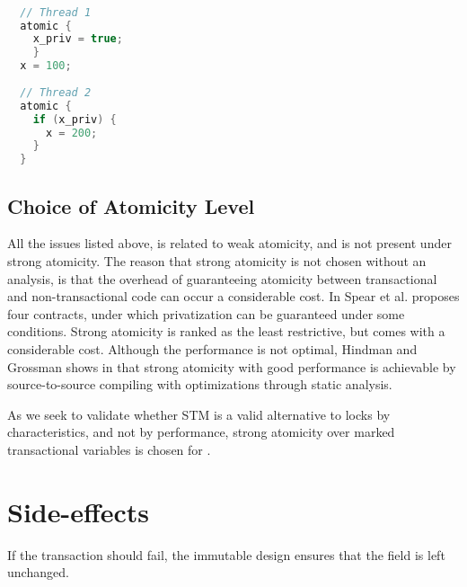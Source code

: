 \begin{lstlisting}[label=lst:privatization,
  caption={Privatization issue},
  language=Java,  
  showspaces=false,
  showtabs=false,
  breaklines=true,
  showstringspaces=false,
  breakatwhitespace=true,
  commentstyle=\color{greencomments},
  keywordstyle=\color{bluekeywords},
  stringstyle=\color{redstrings},
  morekeywords={atomic, retry, orElse, var, get, set}]  % Start your code-block

  // Thread 1
  atomic {
    x_priv = true;
    }
  x = 100;
  
  // Thread 2
  atomic {
    if (x_priv) {
      x = 200;
    }
  }
\end{lstlisting}


\subsection{Choice of Atomicity Level}
All the issues listed above, is related to weak atomicity, and is not present under strong atomicity. The reason that strong atomicity is not chosen without an analysis, is that the overhead of guaranteeing atomicity between transactional and non-transactional code can occur a considerable cost\cite{spear2007privatization}. In \cite{spear2007privatization} Spear et al. proposes four contracts, under which privatization can be guaranteed under some conditions. Strong atomicity is ranked as the least restrictive, but comes with a considerable cost. Although the performance is not optimal, Hindman and Grossman shows in \cite{hindman2006atomicity} that strong atomicity with good performance is achievable by source-to-source compiling with optimizations through static analysis.

As we seek to validate whether \ac{STM} is a valid alternative to locks by characteristics, and not by performance, strong atomicity over marked transactional variables is chosen for \stmname.



\section{Side-effects}\label{sec:side-effects}
If the transaction should fail, the immutable design ensures that the  field is left unchanged. 

